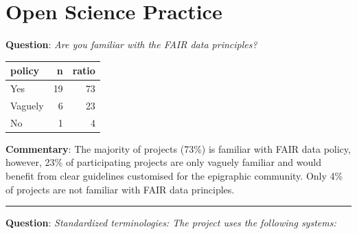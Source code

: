 \documentclass[
  12pt,
]{scrreprt}
\begin{document}
\hypertarget{open-science-practice-1}{%
\section{Open Science Practice}\label{open-science-practice-1}}

\textbf{Question}: \emph{Are you familiar with the FAIR data
principles?}

\begin{longtable}[]{@{}lrr@{}}
\toprule
policy & n & ratio \\
\midrule
\endhead
Yes & 19 & 73 \\
Vaguely & 6 & 23 \\
No & 1 & 4 \\
\bottomrule
\end{longtable}

\textbf{Commentary}: The majority of projects (73\%) is familiar with
FAIR data policy, however, 23\% of participating projects are only
vaguely familiar and would benefit from clear guidelines customised for
the epigraphic community. Only 4\% of projects are not familiar with
FAIR data principles.

\begin{center}\rule{0.5\linewidth}{0.5pt}\end{center}

\textbf{Question}: \emph{Standardized terminologies: The project uses
the following systems:}
\end{document}
